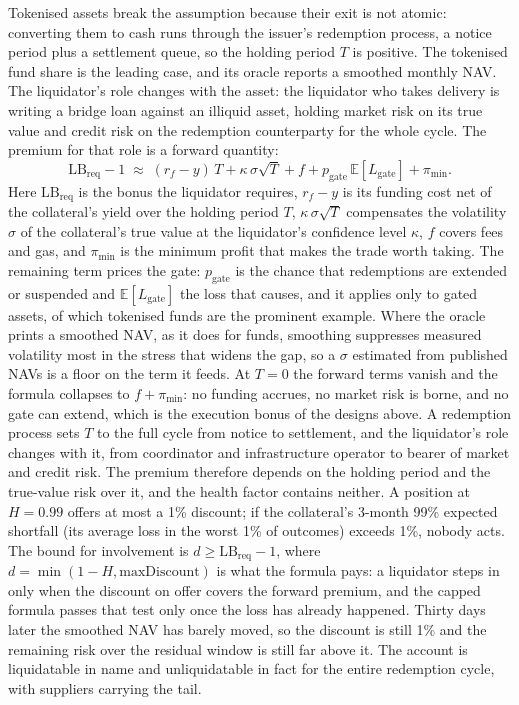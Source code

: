 \documentclass[11pt,a4paper]{article}
\begin{document}
Tokenised assets break the assumption because their exit is not atomic: converting them to cash runs through the issuer's redemption process, a notice period plus a settlement queue, so the holding period $T$ is positive. The tokenised fund share is the leading case, and its oracle reports a smoothed monthly NAV. The liquidator's role changes with the asset: the liquidator who takes delivery is writing a bridge loan against an illiquid asset, holding market risk on its true value and credit risk on the redemption counterparty for the whole cycle. The premium for that role is a forward quantity:
\[
\mathrm{LB}_{\mathrm{req}} - 1 \;\approx\; (r_f - y)\,T + \kappa\,\sigma\sqrt{T} + f + p_{\text{gate}}\,\mathbb{E}[L_{\text{gate}}] + \pi_{\min}.
\]
Here $\mathrm{LB}_{\mathrm{req}}$ is the bonus the liquidator requires, $r_f - y$ is its funding cost net of the collateral's yield over the holding period $T$, $\kappa\,\sigma\sqrt{T}$ compensates the volatility $\sigma$ of the collateral's true value at the liquidator's confidence level $\kappa$, $f$ covers fees and gas, and $\pi_{\min}$ is the minimum profit that makes the trade worth taking. The remaining term prices the gate: $p_{\text{gate}}$ is the chance that redemptions are extended or suspended and $\mathbb{E}[L_{\text{gate}}]$ the loss that causes, and it applies only to gated assets, of which tokenised funds are the prominent example. Where the oracle prints a smoothed NAV, as it does for funds, smoothing suppresses measured volatility most in the stress that widens the gap, so a $\sigma$ estimated from published NAVs is a floor on the term it feeds. At $T = 0$ the forward terms vanish and the formula collapses to $f + \pi_{\min}$: no funding accrues, no market risk is borne, and no gate can extend, which is the execution bonus of the designs above. A redemption process sets $T$ to the full cycle from notice to settlement, and the liquidator's role changes with it, from coordinator and infrastructure operator to bearer of market and credit risk. The premium therefore depends on the holding period and the true-value risk over it, and the health factor contains neither. A position at $H = 0.99$ offers at most a 1\% discount; if the collateral's 3-month 99\% expected shortfall (its average loss in the worst 1\% of outcomes) exceeds 1\%, nobody acts. The bound for involvement is $d \ge \mathrm{LB}_{\mathrm{req}} - 1$, where $d = \min(1-H, \text{maxDiscount})$ is what the formula pays: a liquidator steps in only when the discount on offer covers the forward premium, and the capped formula passes that test only once the loss has already happened. Thirty days later the smoothed NAV has barely moved, so the discount is still 1\% and the remaining risk over the residual window is still far above it. The account is liquidatable in name and unliquidatable in fact for the entire redemption cycle, with suppliers carrying the tail.
\end{document}
